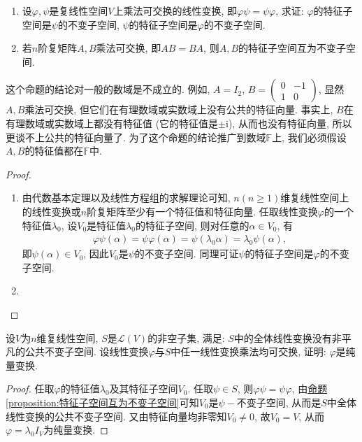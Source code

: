 \documentclass[../../main.tex]{subfiles}%
\begin{document}
\begin{proposition}[特征子空间互为不变子空间]\label{proposition:特征子空间互为不变子空间}
\begin{enumerate}
\item 设\(\varphi,\psi\)是复线性空间\(V\)上乘法可交换的线性变换, 即\(\varphi\psi = \psi\varphi\), 求证: \(\varphi\)的特征子空间是\(\psi\)的不变子空间, \(\psi\)的特征子空间是\(\varphi\)的不变子空间.

\item 若\(n\)阶复矩阵\(A,B\)乘法可交换, 即\(AB = BA\), 则\(A,B\)的特征子空间互为不变子空间.
\end{enumerate}
\end{proposition}
\begin{remark}
这个命题的结论对一般的数域是不成立的. 例如, \(A = I_{2}\), \(B=\begin{pmatrix}
0& -1\\
1& 0
\end{pmatrix}\), 显然\(A,B\)乘法可交换, 但它们在有理数域或实数域上没有公共的特征向量. 事实上, \(B\)在有理数域或实数域上都没有特征值 (它的特征值是\(\pm\mathrm{i}\)), 从而也没有特征向量, 所以更谈不上公共的特征向量了. 为了这个命题的结论推广到数域\(\mathbb{F}\)上, 我们必须假设\(A,B\)的特征值都在\(\mathbb{F}\)中.
\end{remark}
\begin{proof}
\begin{enumerate}
\item 由代数基本定理以及线性方程组的求解理论可知, \(n(n \geqslant  1)\)维复线性空间上的线性变换或\(n\)阶复矩阵至少有一个特征值和特征向量. 任取线性变换\(\varphi\)的一个特征值\(\lambda_{0}\), 设\(V_{0}\)是特征值\(\lambda_{0}\)的特征子空间, 则对任意的\(\alpha \in V_{0}\), 有
\begin{align*}
\varphi\psi(\alpha)=\psi\varphi(\alpha)=\psi(\lambda_{0}\alpha)=\lambda_{0}\psi(\alpha),
\end{align*}
即\(\psi(\alpha) \in V_{0}\), 因此\(V_{0}\)是\(\psi\)的不变子空间. 同理可证\(\psi\)的特征子空间是\(\varphi\)的不变子空间.

\item 
\end{enumerate}
\end{proof}

\begin{proposition}\label{proposition:线性变换与任意线性变换乘法可交换必是纯量变换}
设\(V\)为\(n\)维复线性空间, \(S\)是\(\mathcal{L}(V)\)的非空子集, 满足: \(S\)中的全体线性变换没有非平凡的公共不变子空间. 设线性变换\(\varphi\)与\(S\)中任一线性变换乘法均可交换, 证明: \(\varphi\)是纯量变换.
\end{proposition}
\begin{proof}
任取\(\varphi\)的特征值\(\lambda_{0}\)及其特征子空间\(V_{0}\). 任取\(\psi \in S\), 则\(\varphi\psi = \psi\varphi\), 由\hyperref[proposition:特征子空间互为不变子空间]{命题\ref{proposition:特征子空间互为不变子空间}}可知\(V_{0}\)是\(\psi -\)不变子空间, 从而是\(S\)中全体线性变换的公共不变子空间. 又由特征向量均非零知\(V_{0} \neq 0\), 故\(V_{0}=V\), 从而\(\varphi=\lambda_{0}I_{V}\)为纯量变换. \end{proof}
\end{document}
